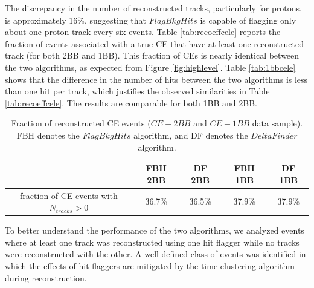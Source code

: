 The discrepancy in the number of reconstructed tracks, particularly 
for protons, is approximately 16\%, suggesting that $FlagBkgHits$ is 
capable of flagging only about one proton track every six events. 
Table \ref{tab:recoeffcele} reports the fraction of events associated 
with a true CE that have at least one reconstructed track (for both 2BB and 1BB). 
This fraction of CEs is nearly identical between the two algorithms, 
as expected from Figure \ref{fig:highlevel}. Table \ref{tab:1bbcele} shows 
that the difference in the number of hits between the two algorithms 
is less than one hit per track, which justifies the observed similarities in 
Table \ref{tab:recoeffcele}. The results are comparable for both 1BB and 2BB.



\begin{center}
    \begin{table}[h!]
    \centering
    \renewcommand{\arraystretch}{1.}
    \begin{tabular}{| c | c | c | c | c |} 
    \hline
    & FBH 2BB & DF 2BB & FBH 1BB & DF 1BB  \\
    \hline
    fraction of CE events with $N_{tracks}>0$ & 36.7\% & 36.5\% & 37.9\% & 37.9\%\\
    \hline
    \end{tabular}
    \caption[Fraction of reconstructed CE events.]{Fraction of reconstructed CE events ($CE-2BB$ and $CE-1BB$ data sample). FBH denotes 
    the $FlagBkgHits$ algorithm, and DF denotes the $DeltaFinder$ algorithm.}
    \end{table}\label{tab:recoeffcele}
\end{center}

To better understand the performance of the two algorithms, 
we analyzed events where at least one track was reconstructed 
using one hit flagger while no tracks were reconstructed 
with the other. A well defined class of events was identified in 
which the effects of hit flaggers are mitigated by the time 
clustering algorithm during reconstruction.

